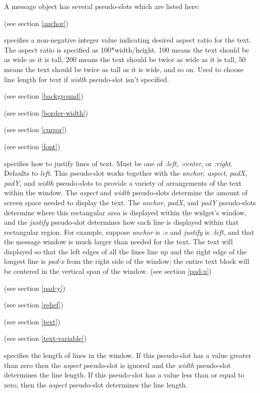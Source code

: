 \noindent
A message object has several pseudo-slots which are listed here:
\begin{ip}

(see section \ref{anchor})

\label{aspect}
specifies a non-negative integer value indicating desired aspect ratio for the
text. The aspect ratio is specified as 100*width/height. 100 means the text
should be as wide as it is tall, 200 means the text should be twice as wide as
it is tall, 50 means the text should be twice as tall as it is wide, and so
on. Used to choose line length for text if {\em width} pseudo-slot isn't
specified.

(see section \ref{background})

(see section \ref{border-width})

(see section \ref{cursor})

(see section \ref{font})

\label{justify}
specifies how to justify lines of text. Must be one of {\em :left}, {\em
:center}, or {\em :right}. Defaults to {\em left}. This pseudo-slot works
together with the {\em anchor}, {\em aspect}, {\em padX}, {\em padY}, and {\em
width} pseudo-slots to provide a variety of arrangements of the text within
the window.  The {\em aspect} and {\em width} pseudo-slots determine the
amount of screen space needed to display the text.  The {\em anchor}, {\em
padX}, and {\em padY} pseudo-slots determine where this rectangular area is
displayed within the widget's window, and the {\em justify} pseudo-slot determines
how each line is displayed within that rectangular region.  For example,
suppose {\em anchor} is {\em :e} and {\em justify} is {\em :left}, and that the
message window is much larger than needed for the text. The text will
displayed so that the left edges of all the lines line up and the right edge
of the longest line is {\em pad-x} from the right side of the window; the
entire text block will be centered in the vertical span of the window.
(see section \ref{pad-x})

(see section \ref{pad-y})

(see section \ref{relief})

(see section \ref{text})

(see section \ref{text-variable})

\label{width}
specifies the length of lines in the window. If this pseudo-slot has a value
greater than zero then the {\em aspect} pseudo-slot is ignored and the {\em
width} pseudo-slot determines the line length.  If this pseudo-slot has a
value less than or equal to zero, then the {\em aspect} pseudo-slot determines
the line length.

\end {ip}

